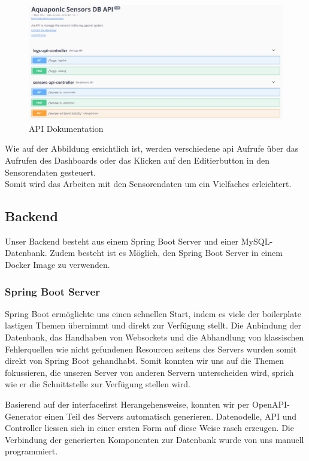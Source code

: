\documentclass[../main.tex]{subfiles}
\begin{document}
	\begin{figure}[H]
		\centering
		\includegraphics[scale=0.4]{../images/API_Documentation}
		\caption{API Dokumentation}
		\label{fig:API_Documentation}
	\end{figure}
	\noindent
	Wie auf der Abbildung ersichtlich ist, werden verschiedene \gls{api} Aufrufe über das Aufrufen des Dashboards oder das Klicken auf den Editierbutton in den Sensorendaten gesteuert. 
	\\
	Somit wird das Arbeiten mit den Sensorendaten um ein Vielfaches erleichtert.
	
	
	\subsection{Backend}
	Unser Backend besteht aus einem Spring Boot Server und einer MySQL-Datenbank. Zudem besteht ist es Möglich, den Spring Boot Server in einem Docker Image zu verwenden.
	
	\subsubsection{Spring Boot Server}
	Spring Boot ermöglichte uns einen schnellen Start, indem es viele der \gls{boilerplate} lastigen Themen übernimmt und direkt zur Verfügung stellt. Die Anbindung der Datenbank, das Handhaben von Websockets und die Abhandlung von klassischen Fehlerquellen wie nicht gefundenen Resourcen seitens des Servers wurden somit direkt von Spring Boot gehandhabt. Somit konnten wir uns auf die Themen fokussieren, die unseren Server von anderen Servern unterscheiden wird, sprich wie er die Schnittstelle zur Verfügung stellen wird.
	
	\noindent Basierend auf der \gls{interfacefirst} Herangehensweise, konnten wir per OpenAPI-Generator einen Teil des Servers automatisch generieren. Datenodelle, API und Controller liessen sich in einer ersten Form auf diese Weise rasch erzeugen. Die Verbindung der generierten Komponenten zur Datenbank wurde von uns manuell programmiert.
	
\end{document}
